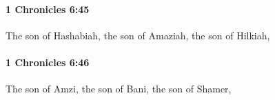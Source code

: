 		\paragraph{1 Chronicles 6:45} %
			\label{1CHRONICLES-6-45}

			The son of Hashabiah, the son of Amaziah, the son of Hilkiah,


		\paragraph{1 Chronicles 6:46} %
			\label{1CHRONICLES-6-46}

			The son of Amzi, the son of Bani, the son of Shamer,



